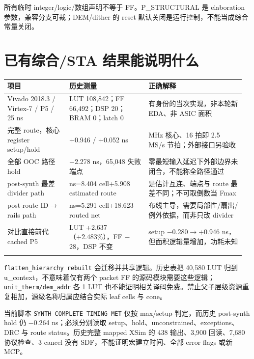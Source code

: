 \documentclass[UTF8,fontset=fandol,10pt,a4paper,openany]{ctexrep}
\newcommand{\code}[1]{\nolinkurl{#1}}
\begin{document}
所有临时 integer/logic/数组声明不等于 FF。P\_STRUCTURAL 是 elaboration 参数，兼容分支可裁；DEM/dither 的 reset 默认关闭是运行控制，不能当成综合常量关闭。


\section{已有综合/STA 结果能说明什么}


\begingroup\small\setlength{\tabcolsep}{2pt}\renewcommand{\arraystretch}{1.25}\begin{longtable}{@{}>{\raggedright\arraybackslash}p{0.25\linewidth}>{\raggedright\arraybackslash}p{0.32\linewidth}>{\raggedright\arraybackslash}p{0.39\linewidth}@{}}
\toprule
\textbf{项目} & \textbf{历史测量} & \textbf{正确解释}\\\midrule\endhead
Vivado 2018.3 / Virtex-7 / P5 / 25 ns & LUT 108,842；FF 66,492；DSP 20；BRAM 0；latch 0 & 有身份的当次实现，非本轮新 EDA、非 ASIC 面积\\\addlinespace[2pt]
完整 route，核心 register setup/hold & +0.946 / +0.052 ns & 40 MHz 核心、16 拍即 2.5 MS/s 节拍；外部接口另验收\\\addlinespace[2pt]
全部 OOC 路径 hold & \ensuremath{-}2.278 ns，65,048 失败端点 & 零最短输入延迟下外部边界未闭合，不能称全路径通过\\\addlinespace[2pt]
post-synth 最差 divider path & 14.312 ns=8.404 cell+5.908 estimated route & 是估计互连、端点与 route 最差不同；不可取倒数当 Fmax\\\addlinespace[2pt]
post-route ID\ensuremath{\rightarrow}rails path & 23.914 ns=5.291 cell+18.623 routed net & 布线主导，需要局部性/扇出/例外依据，而非只改 divider\\\addlinespace[2pt]
对比直接前代 cached P5 & LUT +2,637（+2.483\%），FF \ensuremath{-}28，DSP 不变 & setup \ensuremath{-}0.280\ensuremath{\rightarrow}+0.946 ns，但面积逻辑量增加，功耗未知\\\addlinespace[2pt]
\bottomrule\end{longtable}\endgroup


\code{flatten_hierarchy rebuilt} 会迁移并共享逻辑。历史表把 40,580 LUT 归到 u\_context，不意味着仅有两个 packet FF 的源码模块需要这些逻辑；\code{unit_therm/dem_addr} 各 1 LUT 也不能证明相关译码免费。禁止父子层级资源重复相加，源级名称归属应结合实际 leaf cells 与 cone。


当前脚本 \code{SYNTH_COMPLETE_TIMING_MET} 仅按 max/setup 判定，而历史 post-synth hold 仍 \ensuremath{-}0.264 ns；必须分别读取 setup、hold、unconstrained、exceptions、DRC 与 route status。历史完整 mapped XSim 的 438 输出、3,900 回读、7,680 协议检查、3 cancel 没有 SDF，不能证明宏建立时间、全部 error flags 或新 MCP。
\end{document}
